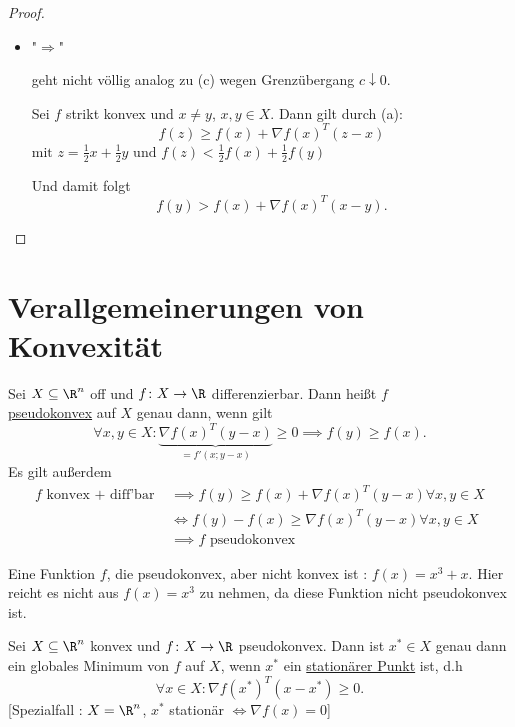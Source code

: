 \begin{proof}
\begin{itemize}[label=]
\begin{itemize}[label=]
 \item "$\Rightarrow$"

 geht nicht völlig analog zu (c) wegen Grenzübergang $c \downarrow 0$.

 Sei $f$ strikt konvex und $x\neq y$, $x,y \in X$. Dann gilt durch (a):
\[
	f(z) \geq f(x) + \nabla f(x)^{T}(z-x)
\] 
$  \text{mit }z=\frac{1}{2}x + \frac{1}{2}y \text{ und } f(z) < \frac{1}{2}f(x) + \frac{1}{2}f(y)$ 

Und damit folgt
\[
	f(y) > f(x) + \nabla f(x)^{T}(x-y)
.\] 
	\end{itemize}
\end{itemize}

\end{proof}

\section*{Verallgemeinerungen von Konvexität}%
\label{sec:Verallgemeinerungen von Konvexität}

\begin{definition}
\label{thm:pseudokonvexität}
	Sei $X \subseteq \R^{n}$ off und $f \colon X \rightarrow \R $ differenzierbar. Dann heißt $f$\\ \underline{pseudokonvex} auf $X$ genau dann, wenn gilt 
	\[
		\forall x,y \in X \colon \underbrace{\nabla f(x)^{T}(y-x)}_{=f'(x; y-x)} \geq 0 \implies f(y) \geq f(x)
	.\] 
Es gilt außerdem
\begin{align*}
	f \text{ konvex + diff'bar } & \implies f(y) \geq f(x) + \nabla f(x)^{T}(y-x) \forall x,y \in X \\
								 & \iff f(y) - f(x) \geq \nabla f(x)^{T}(y-x) \forall x,y \in X \\
								 &\implies f \text{ pseudokonvex}
\end{align*}
\end{definition}


\begin{beispiel}
\label{thm:bsppseudokonvex}
Eine Funktion $f$, die pseudokonvex, aber nicht konvex ist : $f(x) = x^{3} + x$. Hier reicht es nicht aus $f(x)=x^{3}$ zu nehmen, da diese Funktion nicht pseudokonvex ist.
\end{beispiel}

\begin{satz}
\label{thm:stationäresatz}
	Sei $X \subseteq \R^{n}$ konvex und $f \colon X \rightarrow \R $ pseudokonvex. Dann ist ${x}^{*} \in X$ genau dann ein globales Minimum von $f$ auf $X$, wenn ${x}^{*}$ ein \underline{stationärer Punkt} ist, d.h
	\[
		\forall x \in X \colon \nabla f({x}^{*})^{T}(x-{x}^{*}) \geq 0
	.\]
	[Spezialfall : $X = \R^{n}$, ${x}^{*}$ stationär $\iff \nabla f(x) = 0$]
\end{satz}

